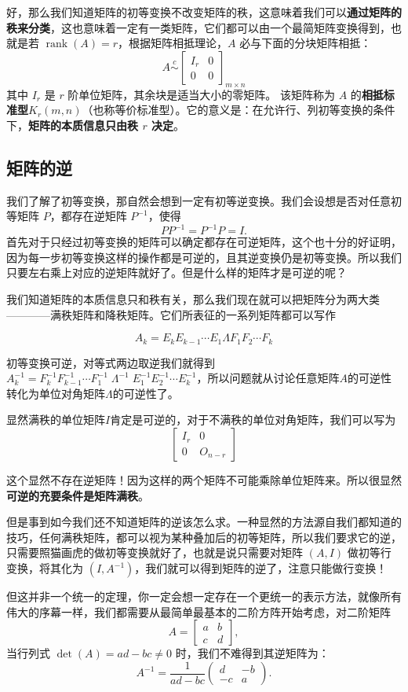 \documentclass[UTF8]{ctexbook}
\begin{document}
好，那么我们知道矩阵的初等变换不改变矩阵的秩，这意味着我们可以\textbf{通过矩阵的秩来分类}，这也意味着一定有一类矩阵，它们都可以由一个最简矩阵变换得到，也就是若 $\operatorname{rank}(A)=r$，根据矩阵相抵理论，$A$ 必与下面的分块矩阵相抵：
\[
A\overset{c}{\sim}
\begin{bmatrix}
I_r & 0\\
0 & 0
\end{bmatrix}_{m\times n}
\]
其中 $I_r$ 是 $r$ 阶单位矩阵，其余块是适当大小的零矩阵。
该矩阵称为 $A$ 的\textbf{相抵标准型$K_r(m,n)$}（也称等价标准型）。它的意义是：在允许行、列初等变换的条件下，\textbf{矩阵的本质信息只由秩 $r$ 决定}。

\subsection{矩阵的逆}

我们了解了初等变换，那自然会想到一定有初等逆变换。我们会设想是否对任意初等矩阵 $P$，都存在逆矩阵 $P^{-1}$，使得
\[
PP^{-1}=P^{-1}P=I.
\]
首先对于只经过初等变换的矩阵可以确定都存在可逆矩阵，这个也十分的好证明，因为每一步初等变换这样的操作都是可逆的，且其逆变换仍是初等变换。所以我们只要左右乘上对应的逆矩阵就好了。但是什么样的矩阵才是可逆的呢？

我们知道矩阵的本质信息只和秩有关，那么我们现在就可以把矩阵分为两大类————满秩矩阵和降秩矩阵。它们所表征的一系列矩阵都可以写作

\[
A_k=E_kE_{k-1}\cdots E_1 \Lambda F_1F_2\cdots F_k
\]

初等变换可逆，对等式两边取逆我们就得到$A_k^{-1} = F_k^{-1} F_{k-1}^{-1} \cdots F_1^{-1} \; \Lambda^{-1} \; E_1^{-1} E_2^{-1} \cdots E_k^{-1}$，所以问题就从讨论任意矩阵$A$的可逆性转化为单位对角矩阵$\Lambda$的可逆性了。

显然满秩的单位矩阵$I$肯定是可逆的，对于不满秩的单位对角矩阵，我们可以写为
\[
\begin{bmatrix}
I_r & 0\\
0 & O_{n-r}
\end{bmatrix}
\]

这个显然不存在逆矩阵！因为这样的两个矩阵不可能乘除单位矩阵来。所以很显然\textbf{可逆的充要条件是矩阵满秩}。

但是事到如今我们还不知道矩阵的逆该怎么求。一种显然的方法源自我们都知道的技巧，任何满秩矩阵，都可以视为某种叠加后的初等矩阵，所以我们要求它的逆，只需要照猫画虎的做初等变换就好了，也就是说只需要对矩阵 $(A,I)$ 做初等行变换，将其化为 $(I,A^{-1})$，我们就可以得到矩阵的逆了，注意只能做行变换！

但这并非一个统一的定理，你一定会想一定存在一个更统一的表示方法，就像所有伟大的序幕一样，我们都需要从最简单最基本的二阶方阵开始考虑，对二阶矩阵
\[
A=\begin{bmatrix}
a & b\\
c & d
\end{bmatrix},
\]
当行列式 $\det(A)=ad-bc\neq 0$ 时，我们不难得到其逆矩阵为：
\[
A^{-1}=\frac{1}{ad-bc}
\begin{pmatrix}
d & -b\\
-c & a
\end{pmatrix}.
\]
\end{document}
